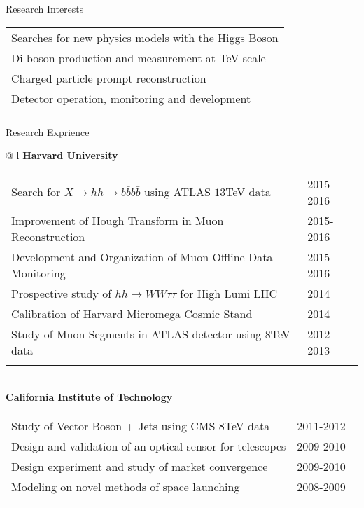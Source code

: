 \documentclass[letterpaper,11pt,oneside]{article}
\begin{document}
 \raggedright
 \Large{Research Interests} \\
 \normalsize
 \begin{flushleft}
\hspace{1cm}
 \begin{tabular}{@{} l}
     Searches for new physics models with the Higgs Boson \\
     Di-boson production and measurement at TeV scale\\
     Charged particle prompt reconstruction \\
     Detector operation, monitoring and development\\
     \\
      \end{tabular}
\end{flushleft}

 \raggedright
 \Large{Research Exprience} \\
 \normalsize
\begin{flushleft}
\hspace{1cm}
 \begin{tabular}{@{} l}
    \textbf{Harvard University} \\ 
    \begin{tabular}{@{} l l }
 Search for $X \to hh \to b\bar{b}b\bar{b}$ using ATLAS $13$TeV data & 2015-2016\\
 Improvement of Hough Transform in Muon Reconstruction & 2015-2016\\
 Development and Organization of Muon Offline Data Monitoring & 2015-2016\\
 Prospective study of $hh \to WW\tau\tau$ for High Lumi LHC & 2014\\
 Calibration of Harvard Micromega Cosmic Stand & 2014\\
 Study of Muon Segments in ATLAS detector using $8$TeV data & 2012-2013\\
    \hspace{0.7\linewidth} & \hspace{0.1\linewidth} \\
     \end{tabular}
     \\
     \textbf{California Institute of Technology} \\
     \begin{tabular}{@{} l l }
 Study of Vector Boson + Jets using CMS $8$TeV data&2011-2012\\
 Design and validation of an optical sensor for telescopes&2009-2010\\
 Design experiment and study of market convergence &2009-2010\\
 Modeling on novel methods of space launching&2008-2009\\
    \hspace{0.7\linewidth} & \hspace{0.1\linewidth} \\
      \end{tabular}
      \end{tabular}
\end{flushleft}
\newpage
\end{document}
